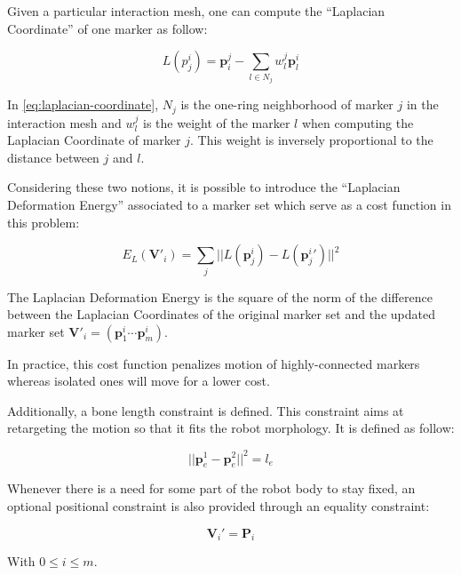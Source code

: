 \documentclass[letterpaper, 10 pt, conference]{ieeeconf}  %
\begin{document}
Given a particular interaction mesh, one can compute the ``Laplacian
Coordinate'' of one marker as follow:

\begin{equation}\label{eq:laplacian-coordinate}
L(p^i_j) = \mathbf{p}_i^j - \sum_{l \in N_j} w^j_l \mathbf{p}^i_l
\end{equation}

In \autoref{eq:laplacian-coordinate}, $N_j$ is the one-ring
neighborhood of marker $j$ in the interaction mesh and $w^j_l$ is the
weight of the marker $l$ when computing the Laplacian Coordinate of
marker $j$. This weight is inversely proportional to the distance
between $j$ and $l$.

Considering these two notions, it is possible to introduce the
``Laplacian Deformation Energy'' associated to a marker set which
serve as a cost function in this problem:

\begin{equation}
E_L(\mathbf{V'}_i) = \sum_j || L(\mathbf{p}^i_j) - L(\mathbf{p}^i_j{}') ||^2
\end{equation}

The Laplacian Deformation Energy is the square of the norm of the
difference between the Laplacian Coordinates of the original marker
set and the updated marker set $\mathbf{V}'_i = (\mathbf{p}^i_1 \cdots
\mathbf{p}^i_m)$.

In practice, this cost function penalizes motion of highly-connected
markers whereas isolated ones will move for a lower cost.



Additionally, a bone length constraint is defined. This constraint
aims at retargeting the motion so that it fits the robot
morphology. It is defined as follow:

\begin{equation}
|| \mathbf{p}^1_e - \mathbf{p}^2_e ||^2 = l_e
\end{equation}


Whenever there is a need for some part of the robot body to stay
fixed, an optional positional constraint is also provided through an
equality constraint:

\begin{equation}
  \mathbf{V}_i' = \mathbf{P}_i
\end{equation}

With $0 \leq i \leq m$.

\end{document}
